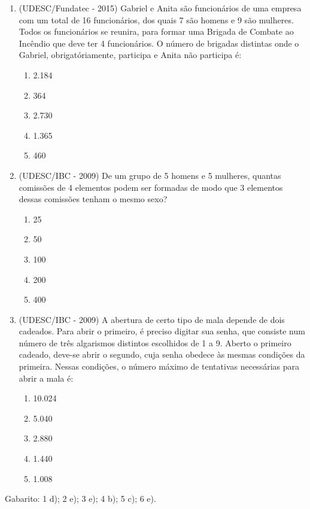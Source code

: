 \begin{enumerate}
 \item (UDESC/Fundatec - 2015) Gabriel e Anita são funcionários de uma empresa com um total de 16 funcionários, dos quais 7 são homens e 9 são mulheres. Todos os funcionários se reunira, para formar uma Brigada de Combate ao Incêndio que deve ter 4 funcionários. O número de brigadas distintas onde o Gabriel, obrigatóriamente, participa e Anita não participa é:
 \begin{enumerate}
 \item 2.184
 \item 364
 \item 2.730
 \item 1.365
 \item 460
 \end{enumerate}
 
 \item (UDESC/IBC - 2009) De um grupo de 5 homens e 5 mulheres, quantas comissões de 4 elementos podem ser formadas de modo que 3 elementos dessas comissões tenham o mesmo sexo?
 \begin{enumerate}
 \item 25
 \item 50
 \item 100 
 \item 200 
 \item 400
 \end{enumerate}
 
 \item (UDESC/IBC - 2009) A abertura de certo tipo de mala depende de dois cadeados. Para abrir o primeiro, é preciso digitar sua senha, que consiste num número de três algarismos distintos escolhidos de 1 a 9. Aberto o primeiro cadeado, deve-se abrir o segundo, cuja senha obedece às mesmas condições da primeira. Nessas condições, o número máximo de tentativas necessárias para abrir a mala é:
 \begin{enumerate}
 \item 10.024
 \item 5.040
 \item 2.880
 \item 1.440
 \item 1.008
 \end{enumerate}
 

\end{enumerate}
Gabarito: 1 d); 2 e); 3 e); 4 b); 5 c); 6 e).  


